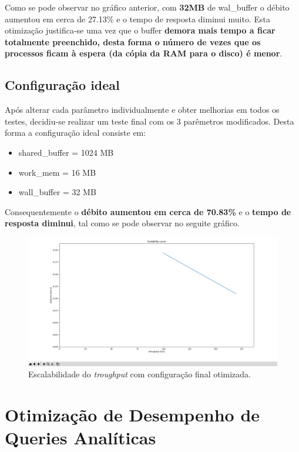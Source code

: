 \hspace{5mm} Como se pode observar no gráfico anterior, com \textbf{32MB} de wal\_buffer o débito aumentou em cerca de 27.13\% e o tempo de resposta diminui muito. Esta otimização justifica-se uma vez que o buffer \textbf{demora mais tempo a ficar totalmente preenchido, desta forma o número de vezes que os processos ficam à espera (da cópia da RAM para o disco) é menor}.

\newpage
\subsection{Configuração ideal}

\hspace{5mm} Após alterar cada parâmetro individualmente e obter melhorias em todos os testes, decidiu-se realizar um teste final com os 3 parêmetros modificados. Desta forma a configuração ideal consiste em:

\begin{itemize}
    \item shared\_buffer = 1024 MB
    \item work\_mem = 16 MB
    \item wall\_buffer = 32 MB
\end{itemize}

Consequentemente o \textbf{débito aumentou em cerca de 70.83\%} e o \textbf{tempo de resposta diminui}, tal como se pode observar no seguite gráfico.

\begin{figure}[H]
    \centering
    \includegraphics[scale=0.25]{imagens/otima.png}
    \caption{Escalabilidade do \emph{troughput} com configuração final otimizada.}
    \label{fig:exemplo}
\end{figure}

\newpage
\section{Otimização de Desempenho de Queries Analíticas}

